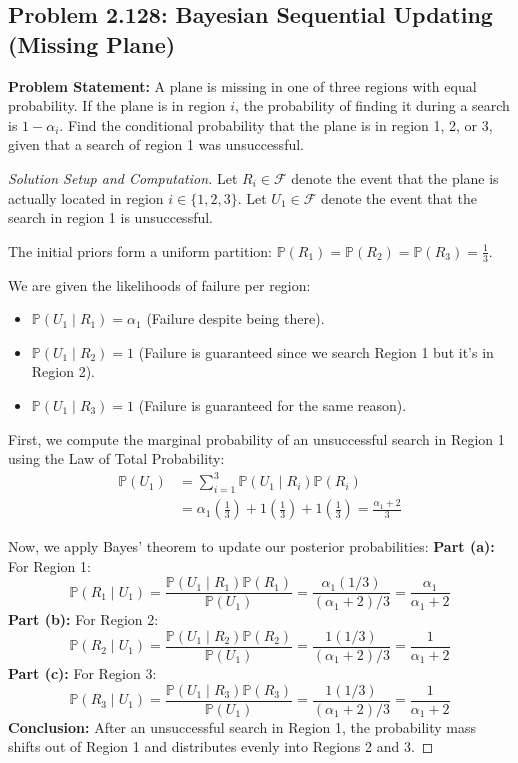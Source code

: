 \documentclass[12pt]{article}
\begin{document}
\subsection{Problem 2.128: Bayesian Sequential Updating (Missing Plane)}
\textbf{Problem Statement:} A plane is missing in one of three regions with equal probability. If the plane is in region $i$, the probability of finding it during a search is $1 - \alpha_i$. Find the conditional probability that the plane is in region 1, 2, or 3, given that a search of region 1 was unsuccessful.

\begin{proof}[Solution Setup and Computation]
Let $R_i \in \mathcal{F}$ denote the event that the plane is actually located in region $i \in \{1, 2, 3\}$.
Let $U_1 \in \mathcal{F}$ denote the event that the search in region 1 is unsuccessful.

The initial priors form a uniform partition: $\mathbb{P}(R_1) = \mathbb{P}(R_2) = \mathbb{P}(R_3) = \frac{1}{3}$.

We are given the likelihoods of failure per region:
\begin{itemize}
    \item $\mathbb{P}(U_1 \mid R_1) = \alpha_1$ (Failure despite being there).
    \item $\mathbb{P}(U_1 \mid R_2) = 1$ (Failure is guaranteed since we search Region 1 but it's in Region 2).
    \item $\mathbb{P}(U_1 \mid R_3) = 1$ (Failure is guaranteed for the same reason).
\end{itemize}

First, we compute the marginal probability of an unsuccessful search in Region 1 using the Law of Total Probability:
\begin{align*}
    \mathbb{P}(U_1) &= \sum_{i=1}^3 \mathbb{P}(U_1 \mid R_i)\mathbb{P}(R_i) \\
    &= \alpha_1 \left(\frac{1}{3}\right) + 1 \left(\frac{1}{3}\right) + 1 \left(\frac{1}{3}\right) = \frac{\alpha_1 + 2}{3}
\end{align*}

Now, we apply Bayes' theorem to update our posterior probabilities:
\textbf{Part (a):} For Region 1:
\[ \mathbb{P}(R_1 \mid U_1) = \frac{\mathbb{P}(U_1 \mid R_1)\mathbb{P}(R_1)}{\mathbb{P}(U_1)} = \frac{\alpha_1(1/3)}{(\alpha_1 + 2)/3} = \frac{\alpha_1}{\alpha_1 + 2} \]
\textbf{Part (b):} For Region 2:
\[ \mathbb{P}(R_2 \mid U_1) = \frac{\mathbb{P}(U_1 \mid R_2)\mathbb{P}(R_2)}{\mathbb{P}(U_1)} = \frac{1(1/3)}{(\alpha_1 + 2)/3} = \frac{1}{\alpha_1 + 2} \]
\textbf{Part (c):} For Region 3:
\[ \mathbb{P}(R_3 \mid U_1) = \frac{\mathbb{P}(U_1 \mid R_3)\mathbb{P}(R_3)}{\mathbb{P}(U_1)} = \frac{1(1/3)}{(\alpha_1 + 2)/3} = \frac{1}{\alpha_1 + 2} \]
\textbf{Conclusion:} After an unsuccessful search in Region 1, the probability mass shifts out of Region 1 and distributes evenly into Regions 2 and 3.
\end{proof}
\end{document}
